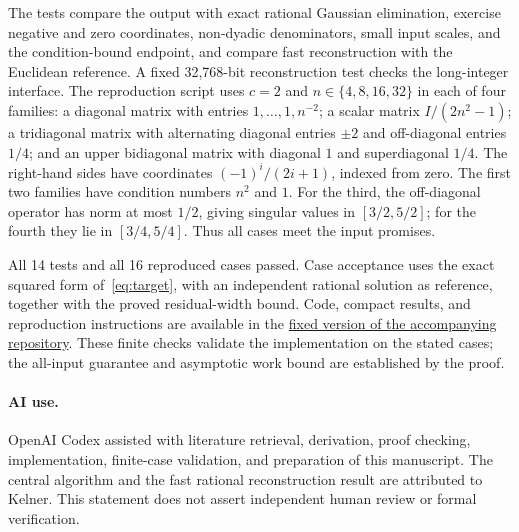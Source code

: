 \documentclass[11pt]{article}
\begin{document}
The tests compare the output with exact rational Gaussian elimination,
exercise negative and zero coordinates, non-dyadic denominators, small input
scales, and the condition-bound endpoint, and compare fast reconstruction
with the Euclidean reference. A fixed 32,768-bit reconstruction test checks
the long-integer interface. The reproduction script uses $c=2$ and
$n\in\{4,8,16,32\}$ in each of four families: a diagonal matrix with entries
$1,\ldots,1,n^{-2}$; a scalar matrix $I/(2n^2-1)$; a tridiagonal matrix with
alternating diagonal entries $\pm2$ and off-diagonal entries $1/4$; and an
upper bidiagonal matrix with diagonal $1$ and superdiagonal $1/4$.
The right-hand sides have coordinates $(-1)^i/(2i+1)$, indexed from zero.
The first two families have condition numbers $n^2$ and $1$. For the third,
the off-diagonal operator has norm at most $1/2$, giving singular values in
$[3/2,5/2]$; for the fourth they lie in $[3/4,5/4]$. Thus all cases meet the
input promises.

All 14 tests and all 16 reproduced cases passed. Case acceptance uses the
exact squared form of~\eqref{eq:target}, with an independent rational
solution as reference, together with the proved residual-width bound.
Code, compact results, and reproduction instructions are available in the
\href{https://github.com/yuiyuiui/aim-044-sparse-lift/tree/d1541aa86177584bcf75dc8545d8859a4d549258}{fixed version of the accompanying repository}. These
finite checks validate the implementation on the stated cases; the
all-input guarantee and asymptotic work bound are established by the proof.

\paragraph{AI use.}
OpenAI Codex assisted with literature retrieval, derivation, proof checking,
implementation, finite-case validation, and preparation of this manuscript.
The central algorithm and the fast rational reconstruction result are
attributed to Kelner. This statement does not assert independent human review
or formal verification.
\end{document}

